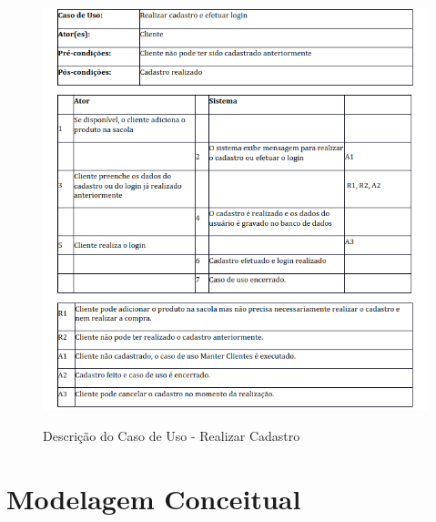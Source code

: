 \begin{figure}[H]  %
    \centering
    \caption{Descrição do Caso de Uso -  Realizar Cadastro}
    \includegraphics[width=1.0\textwidth]{./dados/figuras/2}
    \label{fig:figura-1}
\end{figure}



\section{Modelagem Conceitual}
\label{sec:modcon}

